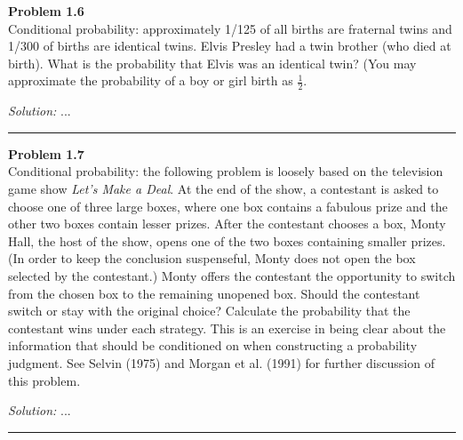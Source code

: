\documentclass[a4paper, 11pt]{article}
\newenvironment{problem}[2][Problem]
    { \begin{mdframed}[backgroundcolor=gray!20] \textbf{#1 #2} \\}
    {  \end{mdframed}}
\newenvironment{solution}
    {\textit{Solution:}}
    {}
\begin{document}
\begin{problem}{1.6}
Conditional probability: approximately 1/125 of all births are fraternal twins and 1/300 of births are identical twins. 
Elvis Presley had a twin brother (who died at birth). What is the probability that Elvis was an identical twin? 
(You may approximate the probability of a boy or girl birth as $\frac{1}{2}$.
\end{problem}
\begin{solution}
...
\end{solution}

\noindent\rule{7in}{2.8pt}

\begin{problem}{1.7}
    Conditional probability: the following problem is loosely based on the television game show \textit{Let’s Make a Deal}. 
    At the end of the show, a contestant is asked to choose one of three large boxes, where one box contains 
    a fabulous prize and the other two boxes contain lesser prizes. After the contestant chooses a box, Monty Hall, 
    the host of the show, opens one of the two boxes containing smaller prizes. 
    (In order to keep the conclusion suspenseful, Monty does not open the box selected by the contestant.)
     Monty offers the contestant the opportunity to switch from the chosen box to the remaining unopened box. 
     Should the contestant switch or stay with the original choice? Calculate the probability that 
     the contestant wins under each strategy. This is an exercise in being clear about the information that 
     should be conditioned on when constructing a probability judgment. 
     See Selvin (1975) and Morgan et al. (1991) for further discussion of this problem.
\end{problem}
\begin{solution}
...
\end{solution}

\noindent\rule{7in}{2.8pt}
\end{document}
